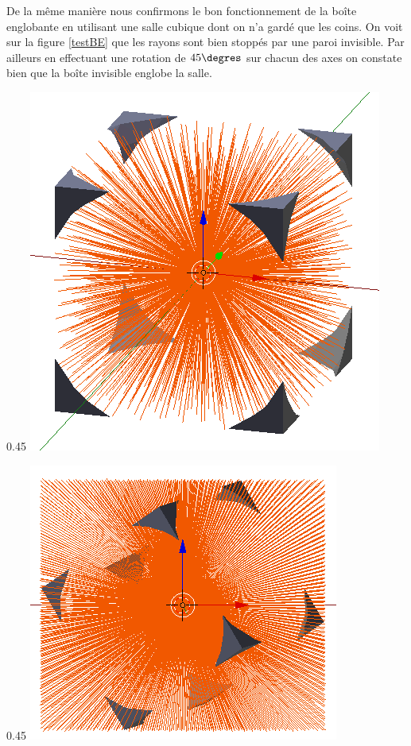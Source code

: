 De la même manière nous confirmons le bon fonctionnement de la boîte englobante en utilisant une salle cubique dont on n'a gardé que les coins. On voit sur la figure \ref{testBE} que les rayons sont bien stoppés par une paroi invisible. Par ailleurs en effectuant une rotation de $45\degres$ sur chacun des axes on constate bien que la boîte invisible englobe la salle.
\begin{figureth}		
	\begin{subfigureth}{0.45\textwidth}
		\includegraphics[width=\linewidth]{images/testBE}
	\end{subfigureth}
	\quad
	\begin{subfigureth}{0.45\textwidth}
		\includegraphics[width=\linewidth]{images/testBEbis}

\end{subfigureth}
\end{figureth}
